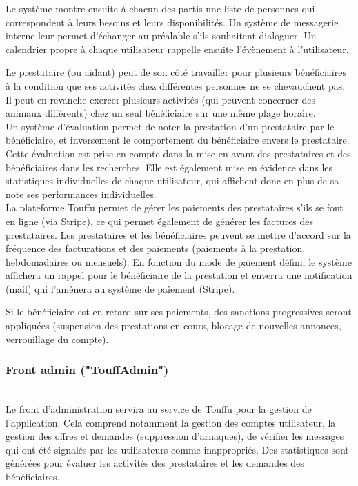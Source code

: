 \documentclass[conference]{IEEEtran}
\begin{document}
Le système montre ensuite à chacun des partis une liste de personnes qui correspondent à leurs besoins et leurs disponibilités. Un système de messagerie interne leur permet d'échanger au préalable s'ils souhaitent dialoguer. Un calendrier propre à chaque utilisateur rappelle ensuite l'évènement à l'utilisateur.

Le prestataire (ou aidant) peut de son côté travailler pour plusieurs bénéficiaires à la condition que ses activités chez différentes personnes ne se chevauchent pas. Il peut en revanche exercer plusieurs activités (qui peuvent concerner des animaux différents) chez un seul bénéficiaire sur une même plage horaire.\\

Un système d'évaluation permet de noter la prestation d'un prestataire par le bénéficiaire, et inversement le comportement du bénéficiaire envers le prestataire. Cette évaluation est prise en compte dans la mise en avant des prestataires et des bénéficiaires dans les recherches. Elle est également mise en évidence dans les statistiques individuelles de chaque utilisateur, qui affichent donc en plus de sa note ses performances individuelles.\\

La plateforme Touffu permet de gérer les paiements des prestataires s'ils se font en ligne (via Stripe), ce qui permet également de générer les factures des prestataires. Les prestataires et les bénéficiaires peuvent se mettre d'accord sur la fréquence des facturations et des paiements (paiements à la prestation, hebdomadaires ou mensuels). En fonction du mode de paiement défini, le système affichera un rappel pour le bénéficiaire de la prestation et enverra une notification (mail) qui l'amènera au système de paiement (Stripe).

Si le bénéficiaire est en retard sur ses paiements, des sanctions progressives seront appliquées (suspension des prestations en cours, blocage de nouvelles annonces, verrouillage du compte).\\

\subsubsection{Front admin ("TouffAdmin")}\hfill\\

Le front d'administration servira au service de Touffu pour la gestion de l'application. Cela comprend notamment la gestion des comptes utilisateur, la gestion des offres et demandes (suppression d'arnaques), de vérifier les messages qui ont été signalés par les utilisateurs comme inappropriés. Des statistiques sont générées pour évaluer les activités des prestataires et les demandes des bénéficiaires.
\end{document}
